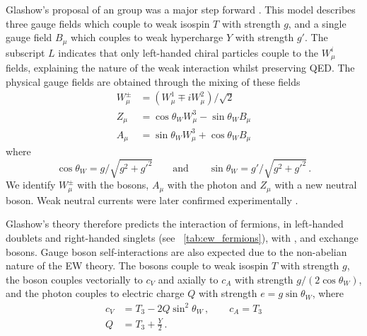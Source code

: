 Glashow's proposal of an \EWgroup group was a major step forward \cite{Glashow:1961}. 
This model describes three gauge fields  
which couple to weak isospin $T$ with strength $g$, and a single gauge field $B_{\mu}$ 
which couples to weak hypercharge $Y$ with strength $g'$. The subscript $L$ indicates 
that only left-handed chiral particles couple to the $W^i_{\mu}$ fields, explaining the 
\VminusA nature of the weak interaction whilst preserving \ac{QED}. The physical gauge 
fields are obtained through the mixing of these fields
\begin{align}
	W^{\pm}_{\mu} &= (W^1_{\mu} \mp i W^2_{\mu}) / \sqrt{2} \label{eq:Wfield} \\
	Z_{\mu} &= \cos\theta_W W^3_{\mu} - \sin\theta_W B_{\mu} \label{eq:Zfield} \\
	A_{\mu} &= \sin\theta_W W^3_{\mu} + \cos\theta_W B_{\mu} \label{eq:Afield}
\end{align}
where
\begin{equation}
	\cos\theta_W = g/\sqrt{g^2 + g'^2}
	\quad\quad \text{and} \quad\quad
	\sin\theta_W = g'/\sqrt{g^2 + g'^2} \,. 
	\label{eq:weak_mixing}
\end{equation}
We identify $W^{\pm}_{\mu}$ with the \PWpm bosons, $A_{\mu}$ with the photon 
and $Z_{\mu}$ with a new neutral \PZ boson. Weak neutral currents were later confirmed 
experimentally \cite{Gargamelle:1973}. 

Glashow's \EWgroup theory therefore predicts the interaction of fermions, in left-handed 
 doublets and right-handed  singlets (see 
\Table~\ref{tab:ew_fermions}), with \PWpm, \PZ and \Pphoton 
exchange bosons. Gauge boson self-interactions are also expected due to the non-abelian 
nature of the \ac{EW} theory. The \PWpm bosons couple to weak isospin $T$ with strength 
$g$, the \PZ boson couples vectorially to $c_V$ and axially to $c_A$ with strength 
$g/(2\cos\theta_W)$, and the photon couples to electric charge $Q$ with strength 
$e = g\sin\theta_W$, where
\begin{align}
	c_V &= T_3 - 2 Q \sin^2\theta_W \,,\quad\quad c_A = T_3 \\
	Q   &= T_3 + \frac{Y}{2} \,.
\end{align}

